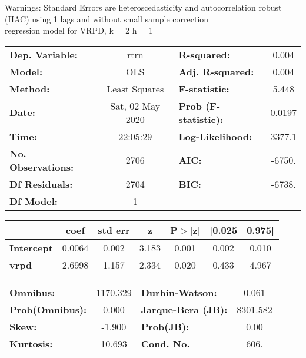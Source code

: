 Warnings: \newline
 [1] Standard Errors are heteroscedasticity and autocorrelation robust (HAC) using 1 lags and without small sample correction\\ 

regression model for VRPD, k = 2 h = 1\begin{center}
\begin{tabular}{lclc}
\toprule
\textbf{Dep. Variable:}    &       rtrn       & \textbf{  R-squared:         } &     0.004   \\
\textbf{Model:}            &       OLS        & \textbf{  Adj. R-squared:    } &     0.004   \\
\textbf{Method:}           &  Least Squares   & \textbf{  F-statistic:       } &     5.448   \\
\textbf{Date:}             & Sat, 02 May 2020 & \textbf{  Prob (F-statistic):} &   0.0197    \\
\textbf{Time:}             &     22:05:29     & \textbf{  Log-Likelihood:    } &    3377.1   \\
\textbf{No. Observations:} &        2706      & \textbf{  AIC:               } &    -6750.   \\
\textbf{Df Residuals:}     &        2704      & \textbf{  BIC:               } &    -6738.   \\
\textbf{Df Model:}         &           1      & \textbf{                     } &             \\
\bottomrule
\end{tabular}
\begin{tabular}{lcccccc}
                   & \textbf{coef} & \textbf{std err} & \textbf{z} & \textbf{P$> |$z$|$} & \textbf{[0.025} & \textbf{0.975]}  \\
\midrule
\textbf{Intercept} &       0.0064  &        0.002     &     3.183  &         0.001        &        0.002    &        0.010     \\
\textbf{vrpd}      &       2.6998  &        1.157     &     2.334  &         0.020        &        0.433    &        4.967     \\
\bottomrule
\end{tabular}
\begin{tabular}{lclc}
\textbf{Omnibus:}       & 1170.329 & \textbf{  Durbin-Watson:     } &    0.061  \\
\textbf{Prob(Omnibus):} &   0.000  & \textbf{  Jarque-Bera (JB):  } & 8301.582  \\
\textbf{Skew:}          &  -1.900  & \textbf{  Prob(JB):          } &     0.00  \\
\textbf{Kurtosis:}      &  10.693  & \textbf{  Cond. No.          } &     606.  \\
\bottomrule
\end{tabular}
\end{center}

